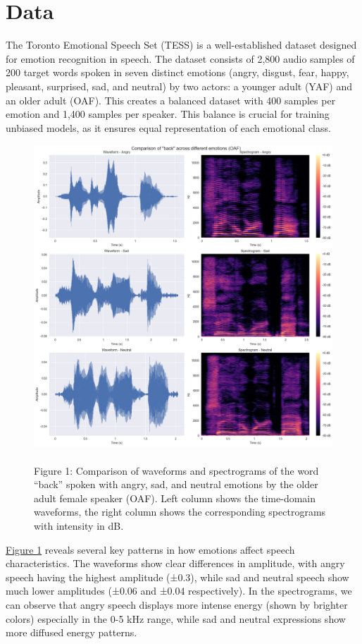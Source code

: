 \documentclass[../main.tex]{subfiles}
\begin{document}
\section{Data}
The Toronto Emotional Speech Set (TESS) is a well-established dataset
designed for emotion recognition in speech. The dataset consists of 2,800
audio samples of 200 target words spoken in seven distinct emotions
(angry, disgust, fear, happy, pleasant, surprised, sad, and neutral)
by two actors: a younger adult (YAF) and an older adult (OAF).
This creates a balanced dataset with 400 samples per emotion and 1,400
samples per speaker. This balance is crucial for training unbiased models,
as it ensures equal representation of each emotional class.
\begin{figure}[h]
    \centering
    \includegraphics[width= 350pt]{../resources/tess_analysis.png}
    \caption{\\Figure 1: Comparison of waveforms and spectrograms of the word ``back'' spoken with angry, sad, and neutral emotions by the older adult female speaker (OAF). Left column shows the time-domain waveforms, the right column shows the corresponding spectrograms with intensity in dB.}
    \label{fig:analysis}
\end{figure}
\hyperref[fig:analysis]{Figure 1} reveals several key patterns in how emotions affect
speech characteristics. The waveforms show clear differences in amplitude, with
angry speech having the highest amplitude (±0.3), while sad and neutral speech
show much lower amplitudes (±0.06 and ±0.04 respectively). In the spectrograms,
we can observe that angry speech displays more intense energy
(shown by brighter colors) especially in the 0-5 kHz range, while sad and
neutral expressions show more diffused energy patterns.
\end{document}
